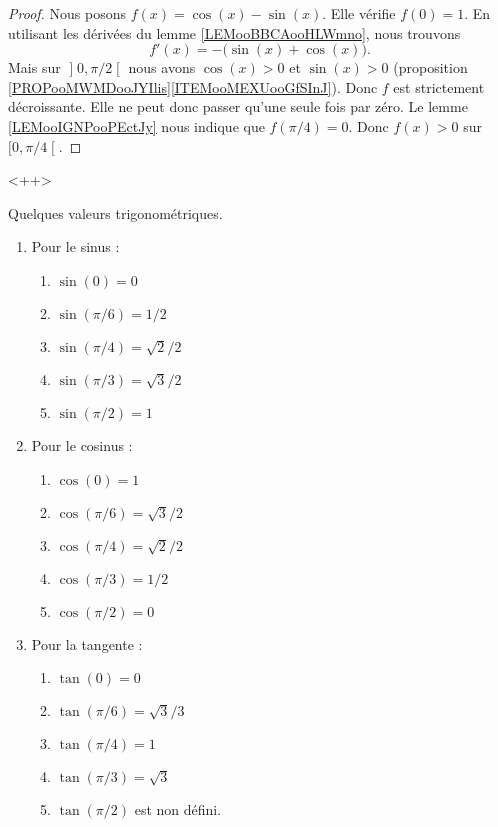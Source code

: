\begin{proof}
	Nous posons \( f(x)=\cos(x)-\sin(x)\). Elle vérifie \( f(0)=1\). En utilisant les dérivées du lemme \ref{LEMooBBCAooHLWmno}, nous trouvons
	\begin{equation}
		f'(x)=-\big( \sin(x)+\cos(x) \big).
	\end{equation}
	Mais sur \( \mathopen] 0 , \pi/2 \mathclose[\) nous avons \( \cos(x)>0\) et \( \sin(x)>0\) (proposition \ref{PROPooMWMDooJYIlis}\ref{ITEMooMEXUooGfSInJ}). Donc \( f\) est strictement décroissante. Elle ne peut donc passer qu'une seule fois par zéro. Le lemme \ref{LEMooIGNPooPEctJy} nous indique que \( f(\pi/4)=0\). Donc \( f(x)>0\) sur \( \mathopen[ 0 , \pi/4 \mathclose[\).
\end{proof}
<++>

\begin{proposition}
	Quelques valeurs trigonométriques.
	\begin{multicols}{2}
		\begin{enumerate}
			\item
			      Pour le sinus :
			      \begin{enumerate}
				      \item
				            \( \sin(0)=0\)
				      \item
				            \( \sin(\pi/6)=1/2\)
				      \item
				            \( \sin(\pi/4)=\sqrt{ 2 }/2\)
				      \item
				            \( \sin(\pi/3)=\sqrt{ 3 }/2\)
				      \item
				            \( \sin(\pi/2)=1\)
			      \end{enumerate}

			\item
			      Pour le cosinus :
			      \begin{enumerate}
				      \item
				            \( \cos(0)=1\)
				      \item
				            \( \cos(\pi/6)=\sqrt{ 3 }/2\)
				      \item
				            \( \cos(\pi/4)=\sqrt{ 2 }/2\)
				      \item
				            \( \cos(\pi/3)=1/2\)
				      \item
				            \( \cos(\pi/2)=0\)
			      \end{enumerate}
			\item
			      Pour la tangente :
			      \begin{enumerate}
				      \item
				            \( \tan(0)=0\)
				      \item
				            \( \tan(\pi/6)=\sqrt{ 3 }/3\)
				      \item
				            \( \tan(\pi/4)=1\)
				      \item
				            \( \tan(\pi/3)=\sqrt{ 3 }\)
				      \item
				            \( \tan(\pi/2)\) est non défini.
			      \end{enumerate}
		\end{enumerate}
	\end{multicols}
\end{proposition}

